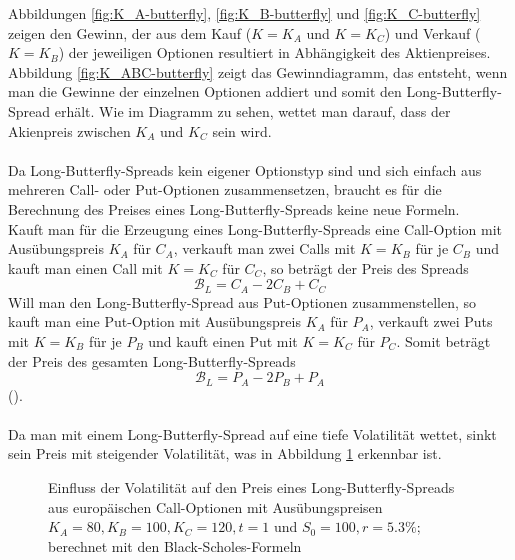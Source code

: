 \documentclass[11pt]{report} %
\begin{document}
Abbildungen \ref{fig:K_A-butterfly}, \ref{fig:K_B-butterfly} und \ref{fig:K_C-butterfly} zeigen den Gewinn, der aus dem Kauf ($K=K_A$ und $K=K_C$) und Verkauf ($K=K_B$) der jeweiligen Optionen resultiert in Abhängigkeit des Aktienpreises. Abbildung \ref{fig:K_ABC-butterfly} zeigt das Gewinndiagramm, das entsteht, wenn man die Gewinne der einzelnen Optionen addiert und somit den Long-Butterfly-Spread erhält. Wie im Diagramm zu sehen, wettet man darauf, dass der Akienpreis zwischen $K_A$ und $K_C$ sein wird. \\\\Da Long-Butterfly-Spreads kein eigener Optionstyp sind und sich einfach aus mehreren Call- oder Put-Optionen zusammensetzen, braucht es für die Berechnung des Preises eines Long-Butterfly-Spreads keine neue Formeln.\\Kauft man für die Erzeugung eines Long-Butterfly-Spreads eine Call-Option mit Ausübungspreis $K_A$ für $C_A$, verkauft man zwei Calls mit $K=K_B$ für je $C_B$ und kauft man einen Call mit $K=K_C$ für $C_C$, so beträgt der Preis des Spreads $$\mathcal{B}_L=C_A-2C_B+C_C$$ Will man den Long-Butterfly-Spread aus Put-Optionen zusammenstellen, so kauft man eine Put-Option mit Ausübungspreis $K_A$ für $P_A$, verkauft zwei Puts mit $K=K_B$ für je $P_B$ und kauft einen Put mit $K=K_C$ für $P_C$. Somit beträgt der Preis des gesamten Long-Butterfly-Spreads $$\mathcal{B}_L=P_A-2P_B+P_A$$ (\cite{Kolb2009}).\\\\
Da man mit einem Long-Butterfly-Spread auf eine tiefe Volatilität wettet, sinkt sein Preis mit steigender Volatilität, was in Abbildung \ref{fig:sigma-B_L} erkennbar ist.
\begin{figure}[h]
    \centering
    \caption{Einfluss der Volatilität auf den Preis eines Long-Butterfly-Spreads aus europäischen Call-Optionen mit Ausübungspreisen $K_A=80, K_B=100, K_C=120, t=1$ und $S_0=100, r=5.3\%$; berechnet mit den Black-Scholes-Formeln}
    \label{fig:sigma-B_L}
\end{figure} 
\end{document}
